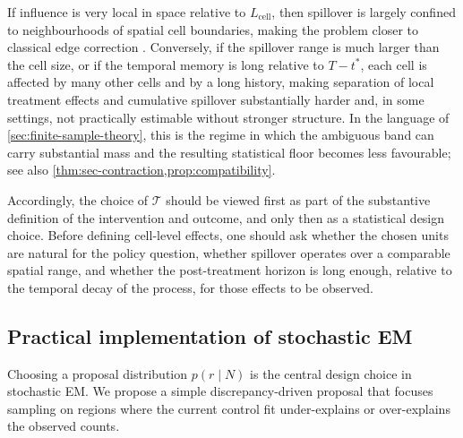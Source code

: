 \documentclass{statsoc}
\newcommand{\1}{\mathbbm{1}}
\begin{document}
If influence is very local in space relative to \(L_{\text{cell}}\), then spillover is largely confined to neighbourhoods of spatial cell boundaries, making the problem closer to classical edge correction \citep{cronie2011some}.%
Conversely, if the spillover range is much larger than the cell size, or if the temporal memory is long relative to \(T-t^\ast\), each cell is affected by many other cells and by a long history, making separation of local treatment effects and cumulative spillover substantially harder and, in some settings, not practically estimable without stronger structure. In the language of \cref{sec:finite-sample-theory}, this is the regime in which the ambiguous band can carry substantial mass and the resulting statistical floor becomes less favourable; see also \cref{thm:sec-contraction,prop:compatibility}.

Accordingly, the choice of \(\mathcal T\) should be viewed first as part of the substantive definition of the intervention and outcome, and only then as a statistical design choice. Before defining cell-level effects, one should ask whether the chosen units are natural for the policy question, whether spillover operates over a comparable spatial range, and whether the post-treatment horizon is long enough, relative to the temporal decay of the process, for those effects to be observed.

\subsection{Practical implementation of stochastic EM}\label{sec:pracImpSEM}

Choosing a proposal distribution \(p(r\mid N)\) is the central design choice in stochastic EM. We propose a simple discrepancy-driven proposal that focuses sampling on regions where the current control fit under-explains or over-explains the observed counts.
\end{document}
